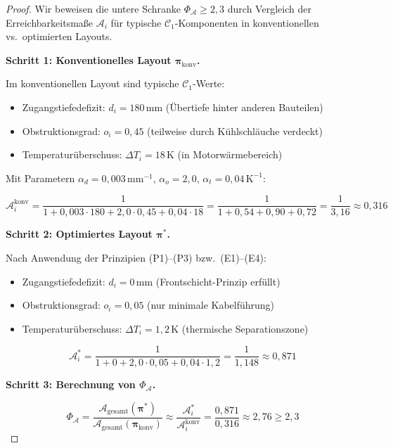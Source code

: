 ﻿\documentclass[12pt,a4paper]{article}
\begin{document}
\begin{proof}
Wir beweisen die untere Schranke $\Phi_\mathcal{A} \geq 2{,}3$ durch Vergleich
der Erreichbarkeitsmaße $\mathcal{A}_i$ für typische $\mathcal{C}_1$-Komponenten
in konventionellen vs.\ optimierten Layouts.

\textbf{Schritt 1: Konventionelles Layout $\boldsymbol{\pi}_\mathrm{konv}$.}

Im konventionellen Layout sind typische $\mathcal{C}_1$-Werte:
\begin{itemize}[leftmargin=*]
	\item Zugangstiefedefizit: $d_i = 180\,\mathrm{mm}$ (Übertiefe hinter anderen
	Bauteilen)
	\item Obstruktionsgrad: $o_i = 0{,}45$ (teilweise durch Kühlschläuche verdeckt)
	\item Temperaturüberschuss: $\Delta T_i = 18\,\mathrm{K}$ (in Motorwärmebereich)
\end{itemize}

Mit Parametern $\alpha_d = 0{,}003\,\mathrm{mm}^{-1}$,
$\alpha_o = 2{,}0$, $\alpha_t = 0{,}04\,\mathrm{K}^{-1}$:

\begin{equation}
	\mathcal{A}_i^\mathrm{konv} = \frac{1}{1 + 0{,}003 \cdot 180 + 2{,}0 \cdot 0{,}45
		+ 0{,}04 \cdot 18}
	= \frac{1}{1 + 0{,}54 + 0{,}90 + 0{,}72}
	= \frac{1}{3{,}16} \approx 0{,}316
	\label{eq:a_konv}
\end{equation}

\textbf{Schritt 2: Optimiertes Layout $\boldsymbol{\pi}^*$.}

Nach Anwendung der Prinzipien (P1)--(P3) bzw.\ (E1)--(E4):
\begin{itemize}[leftmargin=*]
	\item Zugangstiefedefizit: $d_i = 0\,\mathrm{mm}$ (Frontschicht-Prinzip erfüllt)
	\item Obstruktionsgrad: $o_i = 0{,}05$ (nur minimale Kabelführung)
	\item Temperaturüberschuss: $\Delta T_i = 1{,}2\,\mathrm{K}$ (thermische Separationszone)
\end{itemize}

\begin{equation}
	\mathcal{A}_i^* = \frac{1}{1 + 0 + 2{,}0 \cdot 0{,}05 + 0{,}04 \cdot 1{,}2}
	= \frac{1}{1{,}148} \approx 0{,}871
	\label{eq:a_opt}
\end{equation}

\textbf{Schritt 3: Berechnung von $\Phi_\mathcal{A}$.}

\begin{equation}
	\Phi_\mathcal{A} = \frac{\mathcal{A}_\mathrm{gesamt}(\boldsymbol{\pi}^*)}
	{\mathcal{A}_\mathrm{gesamt}(\boldsymbol{\pi}_\mathrm{konv})}
	\approx \frac{\mathcal{A}_i^*}{\mathcal{A}_i^\mathrm{konv}}
	= \frac{0{,}871}{0{,}316} \approx 2{,}76 \geq 2{,}3
	\label{eq:phi_a_beweis}
\end{equation}


\end{proof}
\end{document}
